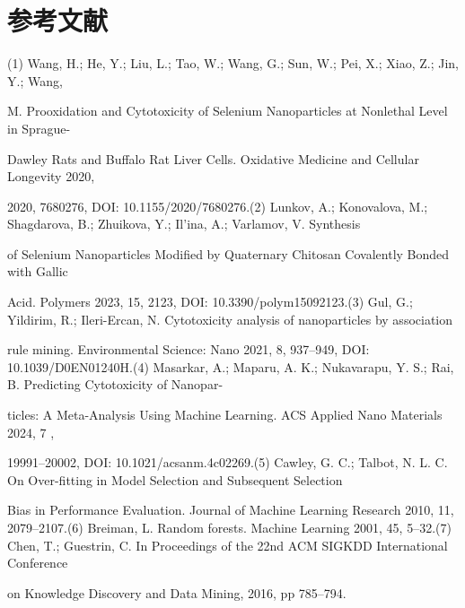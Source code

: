 \section*{参考文献}

(1) Wang, H.; He, Y.; Liu, L.; Tao, W.; Wang, G.; Sun, W.; Pei, X.; Xiao, Z.; Jin, Y.; Wang,

M. Prooxidation and Cytotoxicity of Selenium Nanoparticles at Nonlethal Level in Sprague-

Dawley Rats and Buffalo Rat Liver Cells. Oxidative Medicine and Cellular Longevity 2020,

2020, 7680276, DOI: 10.1155/2020/7680276.(2) Lunkov, A.; Konovalova, M.; Shagdarova, B.; Zhuikova, Y.; Il’ina, A.; Varlamov, V. Synthesis

of Selenium Nanoparticles Modified by Quaternary Chitosan Covalently Bonded with Gallic

Acid. Polymers 2023, 15, 2123, DOI: 10.3390/polym15092123.(3) Gul, G.; Yildirim, R.; Ileri-Ercan, N. Cytotoxicity analysis of nanoparticles by association

rule mining. Environmental Science: Nano 2021, 8, 937–949, DOI: 10.1039/D0EN01240H.(4) Masarkar, A.; Maparu, A. K.; Nukavarapu, Y. S.; Rai, B. Predicting Cytotoxicity of Nanopar-

ticles: A Meta-Analysis Using Machine Learning. ACS Applied Nano Materials 2024, 7 ,

19991–20002, DOI: 10.1021/acsanm.4c02269.(5) Cawley, G. C.; Talbot, N. L. C. On Over-fitting in Model Selection and Subsequent Selection

Bias in Performance Evaluation. Journal of Machine Learning Research 2010, 11, 2079–2107.(6) Breiman, L. Random forests. Machine Learning 2001, 45, 5–32.(7) Chen, T.; Guestrin, C. In Proceedings of the 22nd ACM SIGKDD International Conference

on Knowledge Discovery and Data Mining, 2016, pp 785–794.
